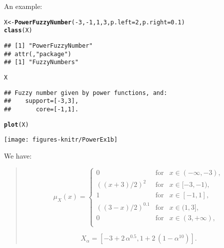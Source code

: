 \documentclass[11pt]{article}\usepackage{graphicx, color}
\makeatletter
\newcommand{\hlfunctioncall}[1]{\textcolor[rgb]{0.501960784313725,0,0.329411764705882}{\textbf{#1}}}%
\newenvironment{kframe}{%
 \def\at@end@of@kframe{}%
 \ifinner\ifhmode%
  \def\at@end@of@kframe{\end{minipage}}%
  \begin{minipage}{\columnwidth}%
 \fi\fi%
 \def\FrameCommand##1{\hskip\@totalleftmargin \hskip-\fboxsep
 \colorbox{shadecolor}{##1}\hskip-\fboxsep
     \hskip-\linewidth \hskip-\@totalleftmargin \hskip\columnwidth}%
 \MakeFramed {\advance\hsize-\width
   \@totalleftmargin\z@ \linewidth\hsize
   \@setminipage}}%
 {\par\unskip\endMakeFramed%
 \at@end@of@kframe}
\newenvironment{knitrout}{}{} %
\makeatother
\begin{document}
An example:
\begin{knitrout}\small
{}\color{fgcolor}\begin{kframe}
\begin{alltt}
X <- \hlfunctioncall{PowerFuzzyNumber}(-3, -1, 1, 3, p.left=2, p.right=0.1)
\hlfunctioncall{class}(X)
\end{alltt}
\begin{verbatim}
## [1] "PowerFuzzyNumber"
## attr(,"package")
## [1] "FuzzyNumbers"
\end{verbatim}
\begin{alltt}
X
\end{alltt}
\begin{verbatim}
## Fuzzy number given by power functions, and:
##    support=[-3,3],
##       core=[-1,1].
\end{verbatim}
\begin{alltt}
\hlfunctioncall{plot}(X)
\end{alltt}
\end{kframe}
\end{knitrout}


\begin{center}
\begin{knitrout}\small
{}\color{fgcolor}

{\centering \texttt{[image: figures-knitr/PowerEx1b]} 

}



\end{knitrout}

\end{center}

We have:
\begin{quote}
\[
\mu_{X}(x) = \left\{
\begin{array}{lll}
0      & \text{for} & x\in(-\infty,-3), \\
((x+3)/2)^{2} & \text{for} & x\in[-3,-1), \\
1      & \text{for} & x\in[-1,1], \\
((3-x)/2)^{0.1} & \text{for} & x\in(1,3], \\
0      & \text{for} & x\in(3,+\infty), \\
\end{array}
\right.
\]

\[
{X}_\alpha = [-3+2\,\alpha^{0.5}, 1+2\,(1-\alpha^{10})].
\]

\end{quote}
\end{document}
